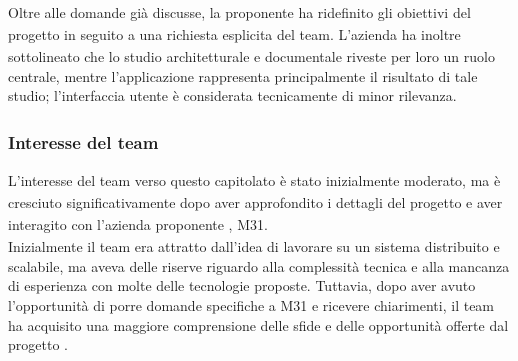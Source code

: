 \documentclass[a4paper,11pt]{article}
\begin{document}
Oltre alle domande già discusse, la proponente\textsubscript{}
 ha ridefinito gli obiettivi del progetto\textsubscript{}
 in seguito a una richiesta esplicita del team. L'azienda ha inoltre sottolineato che lo studio architetturale e documentale riveste per loro un ruolo centrale, mentre l'applicazione rappresenta principalmente il risultato di tale studio; l'interfaccia\textsubscript{} utente è considerata tecnicamente di minor rilevanza.
\subsubsection{Interesse del team}
\parbox[t]{\linewidth}{%
L'interesse del team verso questo capitolato\textsubscript{}
 è stato inizialmente moderato, ma è cresciuto significativamente dopo aver approfondito i dettagli del progetto\textsubscript{}
 e aver interagito con l'azienda proponente\textsubscript{}
, M31. \\
Inizialmente il team era attratto dall'idea di lavorare su un sistema distribuito e scalabile, ma aveva delle riserve riguardo alla complessità tecnica e alla mancanza di esperienza con molte delle tecnologie proposte. Tuttavia, dopo aver avuto l'opportunità di porre domande specifiche a M31 e ricevere chiarimenti, il team ha acquisito una maggiore comprensione delle sfide e delle opportunità offerte dal progetto\textsubscript{}
. \\

}
\newpage
\end{document}
